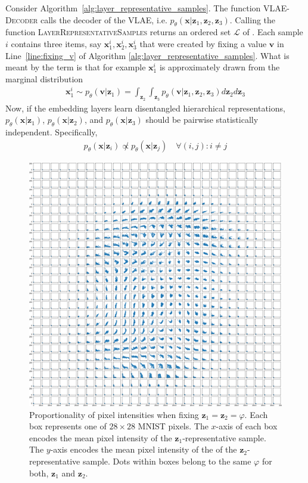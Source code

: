 Consider Algorithm~\ref{alg:layer_representative_samples}.
The function \textsc{VLAE-Decoder} calls the decoder of the VLAE, i.e. $p_\theta(\bm{x} | \bm{z}_1, \bm{z}_2, \bm{z}_3)$.
Calling the function \textsc{LayerRepresentativeSamples} returns an ordered set $\mathcal{L}$ of .
Each sample $i$ contains three items, say $\bm{x}_1^i, \bm{x}_2^i, \bm{x}_3^i$ that were created by fixing a value $\bm{v}$ in Line~\ref{line:fixing_v} of Algorithm \ref{alg:layer_representative_samples}.
What is meant by the term  is that for example $\bm{x}_1^i$ is approximately drawn from the marginal distribution
\begin{align}
    \bm{x}_1^i \sim p_\theta(\bm{v} | \bm{z}_1) = \int_{\bm{z}_2} \int_{\bm{z}_3} p_\theta(\bm{v} | \bm{z}_1, \bm{z}_2, \bm{z}_3) d\bm{z}_2 d\bm{z}_3
\end{align}
Now, if the embedding layers learn disentangled hierarchical representations, $p_\theta(\bm{x} | \bm{z}_1)$, $p_\theta(\bm{x} | \bm{z}_2)$, and $p_\theta(\bm{x} | \bm{z}_3)$ should be pairwise statistically independent.
Specifically,
\begin{align}
    p_\theta(\bm{x} | \bm{z}_i) \not \propto p_\theta(\bm{x} | \bm{z}_j) \quad \forall (i,j):i\neq j \label{eq:notprop}
\end{align}

\begin{figure}
    \centering
    \includegraphics[width=\textwidth]{images/notprop.png}
    \caption{Proportionality of pixel intensities when fixing $\bm{z}_1 = \bm{z}_2=\varphi$. Each box represents one of $28\times 28$ MNIST pixels. The $x$-axis of each box encodes the mean pixel intensity of the $\bm{z}_1$-representative sample. The $y$-axis encodes the mean pixel intensity of the of the $\bm{z}_2$-representative sample. Dots within boxes belong to the same $\varphi$ for both, $\bm{z}_1$ and $\bm{z}_2$. }
    \label{fig:notprop}
\end{figure}

